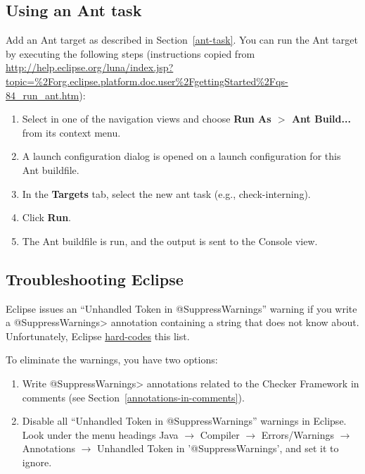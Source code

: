 \subsection{Using an Ant task\label{eclipse-ant}}

Add an Ant target as described in Section~\ref{ant-task}.  You can
run the Ant target by executing the following steps
(instructions copied from {\codesize\url{http://help.eclipse.org/luna/index.jsp?topic=%2Forg.eclipse.platform.doc.user%2FgettingStarted%2Fqs-84_run_ant.htm}}):

\begin{enumerate}

\item
  Select  in one of the navigation views and choose
  {\bf Run As $>$ Ant Build...} from its context menu.

\item
  A launch configuration dialog is opened on a launch configuration
  for this Ant buildfile.

\item
  In the {\bf Targets} tab, select the new ant task (e.g., check-interning).

\item
  Click {\bf Run}.

\item
  The Ant buildfile is run, and the output is sent to the Console view.

\end{enumerate}


\subsection{Troubleshooting Eclipse\label{eclipse-troubleshooting}}

Eclipse issues an ``Unhandled Token in @SuppressWarnings'' warning if you
write a \<@SuppressWarnings> annotation containing a string that does not
know about.  Unfortunately, Eclipse
\href{https://bugs.eclipse.org/bugs/show_bug.cgi?id=122475}{hard-codes}
this list.

To eliminate the warnings, you have two options:

\begin{enumerate}
\item
Write \<@SuppressWarnings> annotations related to the Checker Framework in
comments (see Section~\ref{annotations-in-comments}).
\item
  Disable all ``Unhandled Token in @SuppressWarnings'' warnings in Eclipse.
  Look under the menu headings Java $\rightarrow$ Compiler $\rightarrow$ Errors/Warnings $\rightarrow$ Annotations $\rightarrow$ Unhandled Token in '@SuppressWarnings', and set it to ignore.
\end{enumerate}



